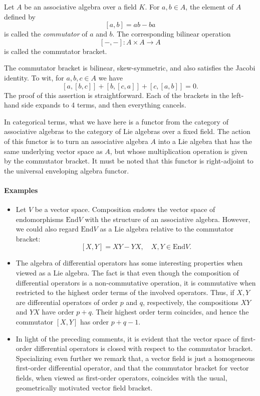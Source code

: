 \documentclass[12pt]{article}
\newcommand{\End}{\mathrm{End}}
\begin{document}
Let $A$ be an associative algebra over a field $K$.  For $a,b \in A$,
the element of $A$ defined by
$$[a,b]=ab-ba$$
is called the {\em commutator} of $a$ and $b$.
The corresponding bilinear operation
$$[-,-]: A\times A\rightarrow A$$
is called the commutator bracket.

The commutator bracket is bilinear, skew-symmetric, and also satisfies
the Jacobi identity.  To wit, for $a,b,c\in A$ we have
$$[a,[b,c]] + [b,[c,a]] + [c,[a,b]] = 0.$$
The proof of this assertion is straightforward.  Each of the brackets in
the left-hand side expands to 4 terms, and then everything cancels.

In categorical terms, what we have here is a functor from the category
of associative algebras to the category of Lie algebras over a fixed
field.  The action of this functor is to turn an associative algebra
$A$ into a Lie algebra that has the same underlying vector space as
$A$, but whose multiplication operation is given by the commutator
bracket.  It must be noted that this functor is right-adjoint to the
universal enveloping algebra functor.

\paragraph{Examples}
\begin{itemize}
\item 
Let $V$ be a vector space.  Composition endows the vector space of
endomorphisms $\End V$ with the structure of an associative algebra.
However, we could also regard $\End V$ as a Lie algebra relative to
the commutator bracket:
$$[X,Y] = XY-YX,\quad X,Y\in \End V.$$
\item The algebra of differential operators has some interesting
  properties when viewed as a Lie algebra.  The fact is that even
  though the composition of differential operators is a
  non-commutative operation, it is commutative when restricted to the
  highest order terms of the involved operators.  Thus, if $X, Y$ are
  differential operators of order $p$ and $q$, respectively, the
  compositions $XY$ and $YX$ have order $p+q$.  Their highest order
  term coincides, and hence the commutator $[X,Y]$ has order $p+q-1$.
\item In light of the preceding comments, it is evident that the
  vector space of first-order differential operators is closed with
  respect to the commutator bracket.  Specializing even further we
  remark that, a vector field is just a homogeneous first-order
  differential operator, and that the commutator bracket for vector
  fields, when viewed as first-order operators, coincides with the
  usual, geometrically motivated vector field bracket.
\end{itemize}
\end{document}
